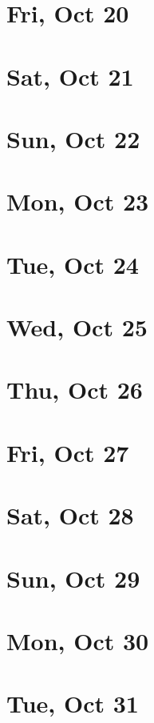 	\section{Fri, Oct 20}
		
	\section{Sat, Oct 21}
		
	\section{Sun, Oct 22}
		
	\section{Mon, Oct 23}
		
	\section{Tue, Oct 24}
		
	\section{Wed, Oct 25}
		
	\section{Thu, Oct 26}
		
	\section{Fri, Oct 27}
		
	\section{Sat, Oct 28}
		
	\section{Sun, Oct 29}
		
	\section{Mon, Oct 30}
		
	\section{Tue, Oct 31}
		
